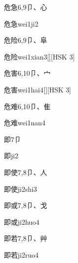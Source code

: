 \begin{entry}{危急}{6,9}{⼙、⼼}
  \begin{phonetics}{危急}{wei1ji2}
  \end{phonetics}
\end{entry}

\begin{entry}{危险}{6,9}{⼙、⾩}
  \begin{phonetics}{危险}{wei1xian3}[][HSK 3]
  \end{phonetics}
\end{entry}

\begin{entry}{危害}{6,10}{⼙、⼧}
  \begin{phonetics}{危害}{wei1hai4}[][HSK 3]
  \end{phonetics}
\end{entry}

\begin{entry}{危难}{6,10}{⼙、⾫}
  \begin{phonetics}{危难}{wei1nan4}
  \end{phonetics}
\end{entry}

\begin{entry}{即}{7}{⼙}
  \begin{phonetics}{即}{ji2}
  \end{phonetics}
\end{entry}

\begin{entry}{即使}{7,8}{⼙、⼈}
  \begin{phonetics}{即使}{ji2shi3}
  \end{phonetics}
\end{entry}

\begin{entry}{即或}{7,8}{⼙、⼽}
  \begin{phonetics}{即或}{ji2huo4}
  \end{phonetics}
\end{entry}

\begin{entry}{即若}{7,8}{⼙、⾋}
  \begin{phonetics}{即若}{ji2ruo4}
  \end{phonetics}
\end{entry}

